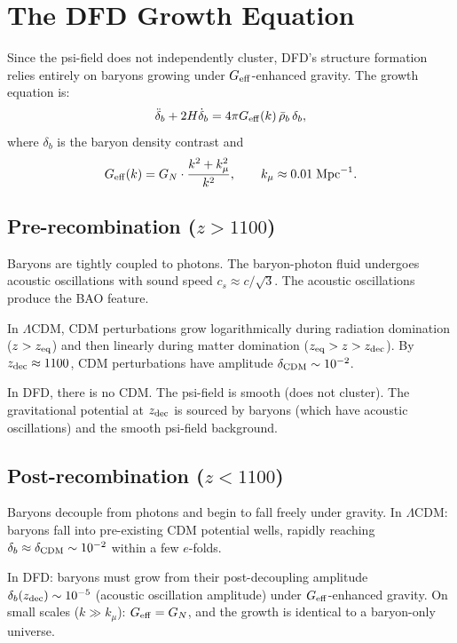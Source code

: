 \documentclass[11pt]{article}
\newcommand{\LCDM}{$\Lambda$CDM}
\newcommand{\Geff}{G_{\rm eff}}
\newcommand{\kmu}{k_\mu}
\begin{document}
\section{The DFD Growth Equation}

Since the psi-field does not independently cluster, DFD's structure
formation relies entirely on baryons growing under $\Geff$-enhanced
gravity. The growth equation is:
\begin{equation}
\ddot\delta_b + 2H\dot\delta_b = 4\pi \Geff(k)\,\bar\rho_b\,\delta_b,
\end{equation}
where $\delta_b$ is the baryon density contrast and
\begin{equation}
\Geff(k) = G_N \cdot \frac{k^2 + \kmu^2}{k^2},
\qquad \kmu \approx 0.01\;\text{Mpc}^{-1}.
\end{equation}

\subsection{Pre-recombination ($z > 1100$)}

Baryons are tightly coupled to photons. The baryon-photon fluid
undergoes acoustic oscillations with sound speed $c_s \approx c/\sqrt{3}$.
The acoustic oscillations produce the BAO feature.

In \LCDM, CDM perturbations grow logarithmically during radiation
domination ($z > z_{\rm eq}$) and then linearly during matter domination
($z_{\rm eq} > z > z_{\rm dec}$). By $z_{\rm dec} \approx 1100$,
CDM perturbations have amplitude $\delta_{\rm CDM} \sim 10^{-2}$.

In DFD, there is no CDM. The psi-field is smooth (does not cluster).
The gravitational potential at $z_{\rm dec}$ is sourced by baryons
(which have acoustic oscillations) and the smooth psi-field background.

\subsection{Post-recombination ($z < 1100$)}

Baryons decouple from photons and begin to fall freely under gravity.
In \LCDM: baryons fall into pre-existing CDM potential wells,
rapidly reaching $\delta_b \approx \delta_{\rm CDM} \sim 10^{-2}$
within a few $e$-folds.

In DFD: baryons must grow from their post-decoupling amplitude
$\delta_b(z_{\rm dec}) \sim 10^{-5}$ (acoustic oscillation amplitude)
under $\Geff$-enhanced gravity. On small scales ($k \gg \kmu$):
$\Geff = G_N$, and the growth is identical to a baryon-only universe.
\end{document}
